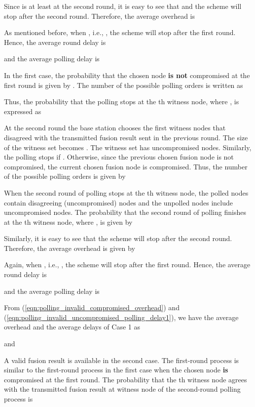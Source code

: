 \documentclass[12pt, onecolumn, draftcls]{IEEEtran}
\begin{document}
Since  is at least  at the second round, it is easy to see
that  and the scheme will stop after the second
round. Therefore, the average overhead is


As mentioned before, when , i.e., , the
scheme will stop after the first round. Hence, the average round
delay is

and the average polling delay is


 In the first case, the probability
that the chosen node {\bf is not} compromised at the first round is
given by . The number of the possible polling orders is
written as

Thus, the probability that the polling stops at the th witness
node, where , is expressed as

At the second round the base station chooses the first witness nodes
that disagreed with the transmitted fusion result sent in the
previous round. The size of the witness set becomes
. The witness set has  uncompromised nodes. Similarly, the polling stops if
. Otherwise, since the previous chosen fusion node is
not compromised, the current chosen fusion node is compromised.
Thus, the number of the possible polling orders is given by

When the second round of polling stops at the th witness node,
the  polled nodes contain  disagreeing
(uncompromised) nodes and the unpolled nodes include
 uncompromised nodes. The probability
that the second round of polling finishes at the th witness node,
where , is given by

Similarly, it is easy to see that the scheme will stop after the
second round. Therefore, the average overhead is given by

Again, when , i.e., , the scheme will stop
after the first round. Hence, the average round delay is

and the average polling delay is


From (\ref{eqn:polling_invalid_compromised_overhead}) and
(\ref{eqn:polling_invalid_uncompromised_polling_delay1}), we have
the average overhead and the average delays of Case 1 as



and


A valid fusion result is available in the second case. The
first-round process is similar to the first-round process in the
first case when the chosen node {\bf is} compromised at the first
round. The probability that the th witness node agrees with the
transmitted fusion result at witness node  of the second-round
polling process is
\end{document}
